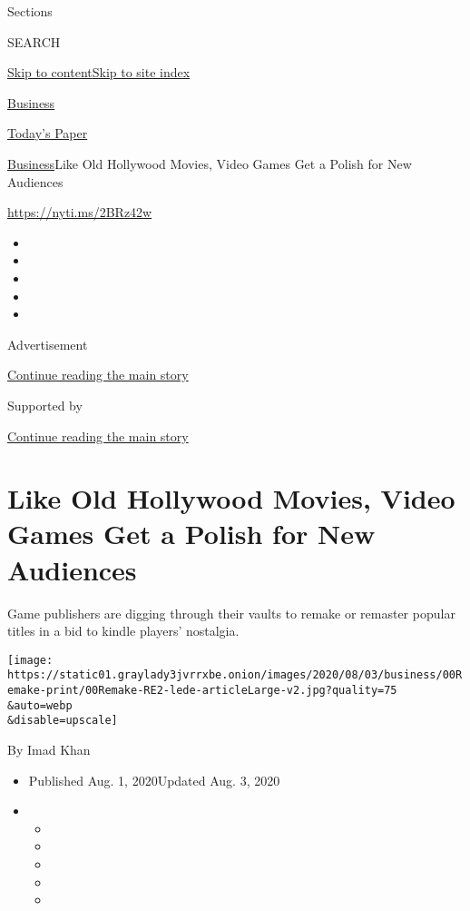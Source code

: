 Sections

SEARCH

\protect\hyperlink{site-content}{Skip to
content}\protect\hyperlink{site-index}{Skip to site index}

\href{https://www.nytimes3xbfgragh.onion/section/business}{Business}

\href{https://myaccount.nytimes3xbfgragh.onion/auth/login?response_type=cookie\&client_id=vi}{}

\href{https://www.nytimes3xbfgragh.onion/section/todayspaper}{Today's
Paper}

\href{/section/business}{Business}\textbar{}Like Old Hollywood Movies,
Video Games Get a Polish for New Audiences

\url{https://nyti.ms/2BRz42w}

\begin{itemize}
\item
\item
\item
\item
\item
\end{itemize}

Advertisement

\protect\hyperlink{after-top}{Continue reading the main story}

Supported by

\protect\hyperlink{after-sponsor}{Continue reading the main story}

\hypertarget{like-old-hollywood-movies-video-games-get-a-polish-for-new-audiences}{%
\section{Like Old Hollywood Movies, Video Games Get a Polish for New
Audiences}\label{like-old-hollywood-movies-video-games-get-a-polish-for-new-audiences}}

Game publishers are digging through their vaults to remake or remaster
popular titles in a bid to kindle players' nostalgia.

\texttt{[image: https://static01.graylady3jvrrxbe.onion/images/2020/08/03/business/00Remake-print/00Remake-RE2-lede-articleLarge-v2.jpg?quality=75\\\&auto=webp\\\&disable=upscale]}

By Imad Khan

\begin{itemize}
\item
  Published Aug. 1, 2020Updated Aug. 3, 2020
\item
  \begin{itemize}
  \item
  \item
  \item
  \item
  \item
  \end{itemize}
\end{itemize}

